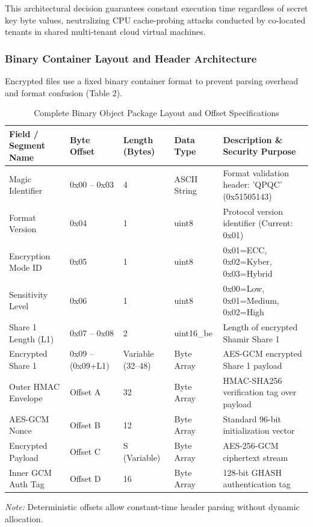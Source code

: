 \documentclass[5p,times]{elsarticle}
\begin{document}
This architectural decision guarantees constant execution time regardless of secret key byte values, neutralizing CPU cache-probing attacks conducted by co-located tenants in shared multi-tenant cloud virtual machines.


\subsubsection{Binary Container Layout and Header Architecture}

Encrypted files use a fixed binary container format to prevent parsing overhead and format confusion (Table 2).

\begin{table}[!t]
  \centering
  \footnotesize
  \caption{Complete Binary Object Package Layout and Offset Specifications}
  \label{tab:2}
  \begin{tabularx}{\textwidth}{p{3.2cm}p{1.8cm}p{2.0cm}p{2.0cm}X}
    \toprule
    \textbf{Field / Segment Name} & \textbf{Byte Offset} & \textbf{Length (Bytes)} & \textbf{Data Type} & \textbf{Description \& Security Purpose} \\
    \midrule
    Magic Identifier & 0x00 -- 0x03 & 4 & ASCII String & Format validation header: 'QPQC' (0x51505143) \\
    Format Version & 0x04 & 1 & uint8 & Protocol version identifier (Current: 0x01) \\
    Encryption Mode ID & 0x05 & 1 & uint8 & 0x01=ECC, 0x02=Kyber, 0x03=Hybrid \\
    Sensitivity Level & 0x06 & 1 & uint8 & 0x00=Low, 0x01=Medium, 0x02=High \\
    Share 1 Length (L1) & 0x07 -- 0x08 & 2 & uint16\_be & Length of encrypted Shamir Share 1 \\
    Encrypted Share 1 & 0x09 -- (0x09+L1) & Variable (32--48) & Byte Array & AES-GCM encrypted Share 1 payload \\
    Outer HMAC Envelope & Offset A & 32 & Byte Array & HMAC-SHA256 verification tag over payload \\
    AES-GCM Nonce & Offset B & 12 & Byte Array & Standard 96-bit initialization vector \\
    Encrypted Payload & Offset C & S (Variable) & Byte Array & AES-256-GCM ciphertext stream \\
    Inner GCM Auth Tag & Offset D & 16 & Byte Array & 128-bit GHASH authentication tag \\
    \bottomrule
  \end{tabularx}
  \vspace{2pt}
  \flushleft\scriptsize \textit{Note:} Deterministic offsets allow constant-time header parsing without dynamic allocation.
\end{table}
\end{document}

